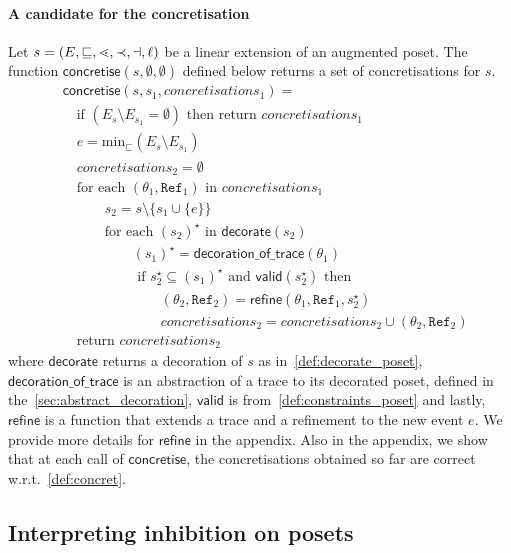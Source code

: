 \paragraph{A candidate for the concretisation}
Let $s = (E,\sqsubseteq,\lessdot,\prec,\dashv,\ell)$ be a linear extension of an augmented poset. The function $\mathsf{concretise}(s,\emptyset,\emptyset)$ defined below returns a set of concretisations for $s$.
\begin{align*}
  &\mathsf{concretise}(s,s_1,\mathit{concretisations}_1) = \\
  &\quad\text{if }(E_s\setminus E_{s_1} = \emptyset)\text{ then return }\mathit{concretisations}_1\\
  &\quad e = \text{min}_{\sqsubset}(E_s\setminus E_{s_1})\\
  &\quad\mathit{concretisations}_2 = \emptyset \\
  &\quad\text{for each }(\theta_1,\mathtt{Ref}_1)\text{ in }\mathit{concretisations}_1\\
  &\quad\qquad s_2 = s\setminus\{s_1\cup\{e\}\}\\
  &\quad\qquad\text{for each }(s_2)^{\star}\text{ in }\mathsf{decorate}(s_2)\\
  &\quad\qquad\qquad (s_1)^{\star} = \mathsf{decoration\_of\_trace}(\theta_1)\\
  &\quad\qquad\qquad \text{ if }s_2^{\star}\subseteq (s_1)^{\star}\text{ and }\mathsf{valid}(s_2^{\star})\text{ then }\\
  &\quad\qquad\qquad\qquad (\mathit{\theta_2},\mathtt{Ref}_2) = \mathsf{refine}(\theta_1,\mathtt{Ref}_1,s_2^{\star})\\
  &\quad\qquad\qquad\qquad \mathit{concretisations}_2 = \mathit{concretisations}_2 \cup (\mathit{\theta_2},\mathtt{Ref}_2)\\
  &\quad\text{return }\mathit{concretisations}_2
\end{align*}
where $\mathsf{decorate}$ returns a decoration of $s$ as in~\autoref{def:decorate_poset}, $\mathsf{decoration\_of\_trace}$ is an abstraction of a trace to its decorated poset, defined in the~\autoref{sec:abstract_decoration}, $\mathsf{valid}$ is from~\autoref{def:constraints_poset} and lastly, $\mathsf{refine}$ is a function that extends a trace and a refinement to the new event $e$. We provide more details for $\mathsf{refine}$ in the appendix. Also in the appendix, we show that at each call of $\mathsf{concretise}$, the concretisations obtained so far are correct w.r.t.~\autoref{def:concret}.

\subsection{Interpreting inhibition on posets}

